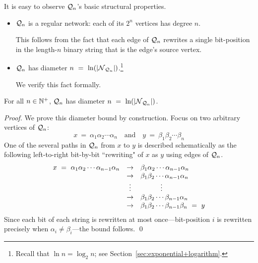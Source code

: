 \noindent
It is easy to observe $\mbox{$\cal Q$}_n$'s basic structural properties.
\begin{itemize}
\item 
$\mbox{$\cal Q$}_n$ is a regular network: each of its $2^n$ vertices has degree $n$.


\smallskip

This follows from the fact that each edge of $\mbox{$\cal Q$}_n$ rewrites a single bit-position in the length-$n$ binary string that is the edge's source vertex.

\medskip\item 
$\mbox{$\cal Q$}_n$ has diameter $n \ = \ \ln(|\mbox{$\cal N$}_{\mbox{{\scriptsize $\cal Q$}}_n}|)$.\footnote{Recall that $\ln n = \log_2 n$; see Section~\ref{sec:exponential+logarithm}.}


\smallskip

We verify this fact formally.
\end{itemize}

\begin{prop}
\label{thm:hypercube-diameter}
For all $n \in \mathbb{N}^+$, $\mbox{$\cal Q$}_n$ has diameter $n \ = \ \ln(|\mbox{$\cal N$}_{\mbox{{\scriptsize $\cal Q$}}_n}|)$.
\end{prop}

\begin{proof}
We prove this diameter bound by construction.  Focus on two arbitrary vertices of $\mbox{$\cal Q$}_n$:
\[ x \ = \ \alpha_1 \alpha_2 \cdots \alpha_n \ \ \ \mbox{ and } \ \ \
y \ = \ \beta_1 \beta_2 \cdots \beta_n
\]
One of the several paths in $\mbox{$\cal Q$}_n$ from $x$ to $y$ is described schematically as the following left-to-right bit-by-bit ``rewriting" of $x$ as $y$ using edges of $\mbox{$\cal Q$}_n$.
\[ \begin{array}{lcl}
x \ = \ \alpha_1 \alpha_2 \cdots \alpha_{n-1} \alpha_n
   & \rightarrow & \beta_1 \alpha_2   \cdots \alpha_{n-1} \alpha_n \\
   & \rightarrow & \beta_1 \beta_2     \cdots \alpha_{n-1} \alpha_n \\
   & \vdots & \hspace*{.4in}\vdots \\
   & \rightarrow & \beta_1 \beta_2 \cdots \beta_{n-1} \alpha_n \\
   & \rightarrow & \beta_1 \beta_2 \cdots \beta_{n-1} \beta_n \ = \ y
    \end{array}
\]
Since each bit of each string is rewritten at most once---bit-position $i$ is rewritten precisely when  $\alpha_i \neq \beta_i$---the bound follows.  \qed
\end{proof}

